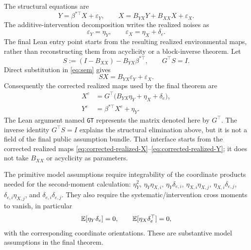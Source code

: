The structural equations are
\begin{equation}
  Y=\beta^{*\top}X+\varepsilon_Y,
  \qquad
  X=B_{YX}Y+B_{XX}X+\varepsilon_X.
  \label{eq:sem}
\end{equation}
The additive-intervention decomposition writes the realized noises as
\begin{equation}
  \varepsilon_Y=\eta_Y,
  \qquad
  \varepsilon_X=\eta_X+\delta_e.
  \label{eq:additive-intervention}
\end{equation}
The final Lean entry point starts from the resulting realized environmental
maps, rather than reconstructing them from acyclicity or a block-inverse
theorem.  Let
\[
  S:=(I-B_{XX})-B_{YX}\beta^{*\top},
  \qquad G^\top S=I.
\]
Direct substitution in \eqref{eq:sem} gives
\begin{equation}
  SX=B_{YX}\varepsilon_Y+\varepsilon_X.
  \label{eq:schur-elimination}
\end{equation}
Consequently the corrected realized maps used by the final theorem are
\begin{align}
  X^e
  &=G^\top\bigl(B_{YX}\eta_Y+\eta_X+\delta_e\bigr),
  \label{eq:corrected-realized-X}\\
  Y^e
  &=\beta^{*\top}X^e+\eta_Y.
  \label{eq:corrected-realized-Y}
\end{align}
The Lean argument named \texttt{GT} represents the matrix denoted here by
$G^\top$.  The inverse identity $G^\top S=I$ explains the structural
elimination above, but it is not a field of the final public assumption
bundle.  That interface starts from the corrected realized maps
\eqref{eq:corrected-realized-X}--\eqref{eq:corrected-realized-Y}; it does not
take $B_{XX}$ or acyclicity as parameters.

The primitive model assumptions require integrability of the coordinate
products needed for the second-moment calculation: $\eta_Y^2$,
$\eta_Y\eta_{X,i}$, $\eta_Y\delta_{e,i}$,
$\eta_{X,i}\eta_{X,j}$, $\eta_{X,i}\delta_{e,j}$,
$\delta_{e,i}\eta_{X,j}$, and $\delta_{e,i}\delta_{e,j}$.  They also require
the systematic/intervention cross moments to vanish, in particular
\begin{equation}
  \mathbb{E}[\eta_Y\delta_e]=0,
  \qquad
  \mathbb{E}[\eta_X\delta_e^\top]=0,
  \label{eq:systematic-intervention-orthogonality}
\end{equation}
with the corresponding coordinate orientations.  These are substantive model
assumptions in the final theorem.

